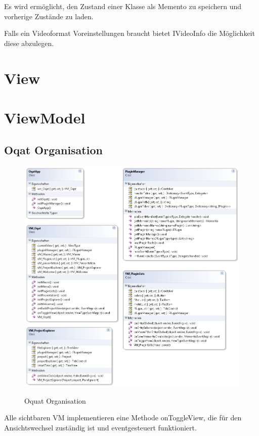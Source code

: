 Es wird ermöglicht, den Zustand einer Klasse als Memento zu speichern und vorherige Zustände zu laden.


Falls ein Videoformat Voreinstellungen braucht bietet IVideoInfo die Möglichkeit diese abzulegen.

\pagebreak
\section{View}


\pagebreak
\section{ViewModel}

\subsection{Oqat Organisation}
\begin{figure}[h]
\noindent\includegraphics[width=\linewidth,height=\textheight,
keepaspectratio]{bilder/Klassendiagramm/VM.png}
\label{}
\caption{Oquat Organisation}
\end{figure}

Alle sichtbaren VM implementieren eine Methode onToggleView, die für den Ansichtswechsel zuständig ist und eventgesteuert funktioniert.

